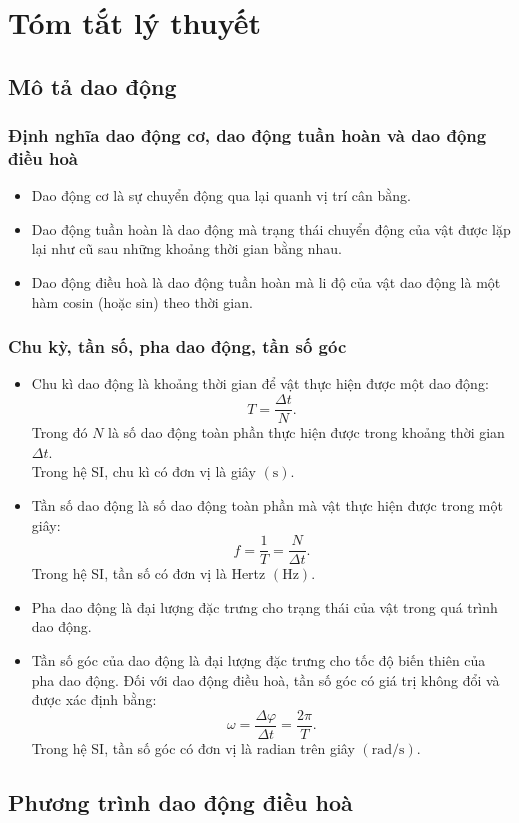 \chapter{Tóm tắt lý thuyết}
\section{Mô tả dao động}
\subsection{Định nghĩa dao động cơ, dao động tuần hoàn và dao động điều hoà}
\begin{itemize}
	\item Dao động cơ là sự chuyển động qua lại quanh vị trí cân bằng.
	\item Dao động tuần hoàn là dao động mà trạng thái chuyển động của vật được lặp lại như cũ sau những khoảng thời gian bằng nhau.
	\item Dao động điều hoà là dao động tuần hoàn mà li độ của vật dao động là một hàm cosin (hoặc sin) theo thời gian.
\end{itemize}
\subsection{Chu kỳ, tần số, pha dao động, tần số góc}
\begin{itemize}
	\item Chu kì dao động là khoảng thời gian để vật thực hiện được một dao động:
	$$T=\dfrac{\Delta t}{N}.$$
	Trong đó $N$ là số dao động toàn phần thực hiện được trong khoảng thời gian $\Delta t$.\\
	Trong hệ SI, chu kì có đơn vị là giây $\left(\si{\second}\right)$.
	\item Tần số dao động là số dao động toàn phần mà vật thực hiện được trong một giây:
	$$f=\dfrac{1}{T}=\dfrac{N}{\Delta t}.$$
	Trong hệ SI, tần số có đơn vị là Hertz $\left(\si{\hertz}\right)$.
	\item Pha dao động là đại lượng đặc trưng cho trạng thái của vật trong quá trình dao động.
	\item Tần số góc của dao động là đại lượng đặc trưng cho tốc độ biến thiên của pha dao động. Đối với dao động điều hoà, tần số góc có giá trị không đổi và được xác định bằng:
	$$\omega=\dfrac{\Delta\varphi}{\Delta t}=\dfrac{2\pi}{T}.$$
	Trong hệ SI, tần số góc có đơn vị là radian trên giây $\left(\si{\radian/\second}\right)$.
\end{itemize}
\section{Phương trình dao động điều hoà}
